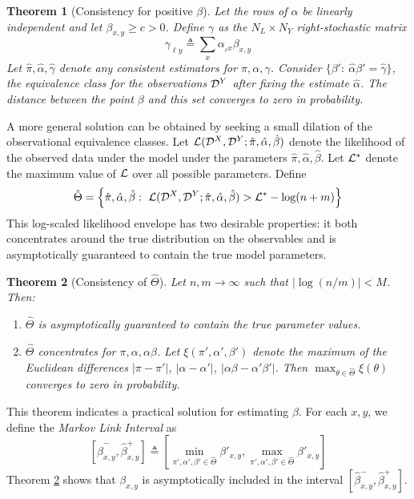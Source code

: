 \documentclass{article}
\newtheorem{thm}{Theorem}
\theoremstyle{definition}
\begin{document}
\begin{thm}[Consistency for positive $\beta$] Let the rows of $\alpha$ be linearly independent and let $\beta_{x,y}\geq c>0$.  Define $\gamma$ as the $N_L\times N_Y$ right-stochastic matrix
\[
\gamma_{\ell y} \triangleq \sum_{x} \alpha_{_\ell x} \beta_{x,y}
\]
Let $\hat \pi, \hat \alpha, \hat \gamma$ denote any consistent estimators for $\pi,\alpha,\gamma$.  Consider $\{\beta':\ \hat \alpha\beta'=\hat \gamma \}$, the equivalence class for the observations $\mathcal{D}^Y$ after fixing the estimate $\hat \alpha$.  The distance between the point $\beta$ and this set converges to zero in probability.  
\end{thm}

A more general solution can be obtained by seeking a small dilation of the observational equivalence classes.  Let $\mathcal{L}(\mathcal{D}^X,\mathcal{D}^Y;\hat \pi,\hat \alpha,\hat \beta)$ denote the likelihood of the observed data under the model under the parameters $\hat \pi,\hat \alpha,\hat \beta$.  Let $\mathcal{L}^*$ denote the maximum value of $\mathcal{L}$ over all possible parameters.  Define
\[
\hat \Theta=\left\{\hat \pi, \hat \alpha,\hat \beta:\ \mathcal{L}(\mathcal{D}^X,\mathcal{D}^Y;\hat \pi,\hat \alpha,\hat \beta) > \mathcal{L}^* - \log(n+m)\right\}
\]
This log-scaled likelihood envelope has two desirable properties: it both concentrates around the true distribution on the observables and is asymptotically guaranteed to contain the true model parameters.
\begin{thm}[Consistency of $\hat \Theta$]\label{thm:consistency} Let $n,m\rightarrow\infty$ such that $|\log(n/m)|<M$.  Then:
\begin{enumerate}
    \item $\hat \Theta$ is asymptotically guaranteed to contain the true parameter values.  
    \item $\hat \Theta$ concentrates for $\pi,\alpha,\alpha\beta$. Let $\xi(\pi',\alpha',\beta')$ denote the maximum of the Euclidean differences $|\pi-\pi'|$, $|\alpha-\alpha'|$, $|\alpha\beta-\alpha'\beta'|$.  Then $\max_{\theta \in \hat \Theta} \xi(\theta)$ converges to zero in probability.   
\end{enumerate}
\end{thm}
This theorem indicates a practical solution for estimating $\beta$.  For each $x,y$, we define the \emph{Markov Link Interval} as 
\[
[\hat \beta^-_{x,y},\hat \beta^+_{x,y}] \triangleq \left[\min_{\pi',\alpha',\beta' \in \hat \Theta} \beta'_{x,y},\max_{\pi',\alpha',\beta' \in \hat \Theta}\beta'_{x,y}\right]
\]  
Theorem \ref{thm:consistency} shows that $\beta_{x,y}$ is asymptotically included in the interval $[\hat \beta^-_{x,y},\hat \beta^+_{x,y}]$.  
\end{document}
